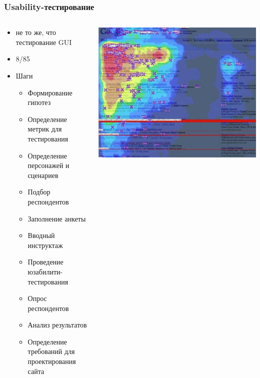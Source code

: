 \documentclass{../../slides-style}
\begin{document}
    \begin{frame}
        \frametitle{Usability-тестирование}
        \begin{columns}
            \begin{column}{0.6\textwidth}
                \begin{itemize}
                    \item не то же, что тестирование GUI
                    \item 8/85
                    \item Шаги
                    \begin{itemize}
                        \item Формирование гипотез
                        \item Определение метрик для тестирования
                        \item Определение персонажей и сценариев
                        \item Подбор респондентов
                        \item Заполнение анкеты
                        \item Вводный инструктаж
                        \item Проведение юзабилити-тестирования
                        \item Опрос респондентов
                        \item Анализ результатов
                        \item Определение требований для проектирования сайта
                    \end{itemize}
                \end{itemize}
            \end{column}
            \begin{column}{0.4\textwidth}
                \begin{center}
                    \includegraphics[width=\textwidth]{heatMap.png}
                \end{center}
            \end{column}
        \end{columns}
    \end{frame}
\end{document}
